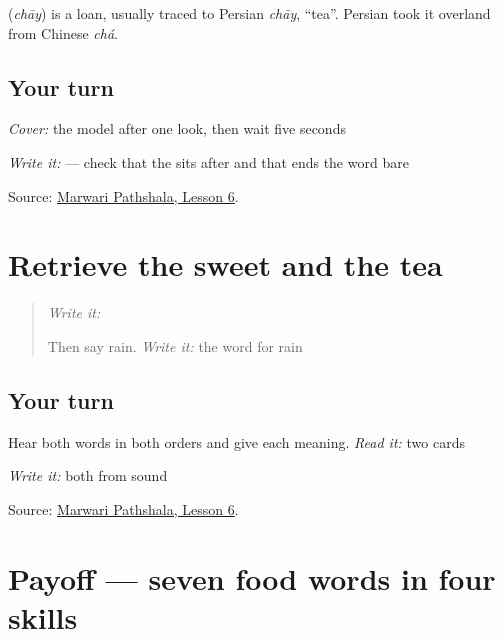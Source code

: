 \begin{cousinweb}
\textbf{} (\emph{chāy}) is a loan, usually traced to Persian \emph{chāy}, \textquotedblleft{}tea\textquotedblright{}. Persian took it overland from Chinese \emph{chá}.
\end{cousinweb}

\subsection*{Your turn}
\emph{Cover:} the model after one look, then wait five seconds

\emph{Write it:} \textbf{} — check that the \textbf{} sits after \textbf{} and that \textbf{} ends the word bare

\begin{tcolorbox}[breakable,colback=teal!4,colframe=teal!35!black,title={Before you move on}]
Source: \href{https://www.marwaripathshala.com/marwari-lesson-6-english}{Marwari Pathshala, Lesson 6}.
\end{tcolorbox}
\section[Practice]{Retrieve the sweet and the tea}

\label{lesson:MW-R20-food-new-two}



\begin{quote}
\emph{Write it:} \textbf{}

Then say rain. \emph{Write it:} the word for rain
\end{quote}

\subsection*{Your turn}
Hear both words in both orders and give each meaning. \emph{Read it:} two cards

\emph{Write it:} both from sound

\begin{tcolorbox}[breakable,colback=teal!4,colframe=teal!35!black,title={Before you move on}]
Source: \href{https://www.marwaripathshala.com/marwari-lesson-6-english}{Marwari Pathshala, Lesson 6}.
\end{tcolorbox}
\section[Practice]{Payoff — seven food words in four skills}

